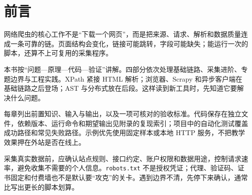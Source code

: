 \chapter{前言}
网络爬虫的核心工作不是“下载一个网页”，而是把来源、请求、解析和数据质量连成一条可靠的链。页面结构会变化，链接可能跳转，字段可能缺失；能运行一次的脚本，还算不上可复用的采集程序。

本书按“问题—原理—代码—验证”讲解。四部分依次处理基础链路、采集进阶、专题边界与工程实践。XPath 紧接 HTML 解析；浏览器、Scrapy 和异步客户端在基础链路之后登场；AST 与分布式放在后段。这样读到新工具时，先知道它要解决什么问题。

每章列出前置知识、输入与输出，以及一项可核对的验收标准。代码保存在独立文件，依赖版本、运行命令和期望输出见附录的复现索引；项目中的自动化测试覆盖成功路径和常见失败路径。示例优先使用固定样本或本地 HTTP 服务，不把教学效果押在外站是否在线上。

采集真实数据前，应确认站点规则、接口约定、账户权限和数据用途，控制请求速率，避免收集不需要的个人信息。\texttt{robots.txt} 不是授权凭证；代理、验证码、证书固定和付费墙也不是默认要“攻克”的关卡。遇到边界不清，先停下来确认，通常比写出更长的脚本划算。
